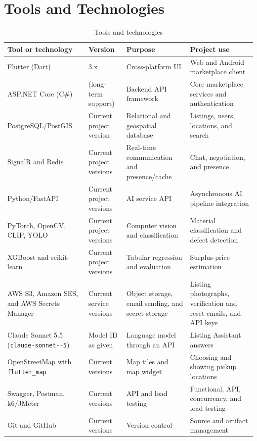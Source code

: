 \section{Tools and Technologies}
\label{sec:tools}
\begin{table}[H]
\centering
\caption{Tools and technologies}
\label{tab:tools-technologies}
\small
\begin{tabularx}{\textwidth}{@{}>{\raggedright\arraybackslash}p{}>{\raggedright\arraybackslash}p{}>{\raggedright\arraybackslash}X >{\raggedright\arraybackslash}X@{}}
\toprule
\textbf{Tool or technology} & \textbf{Version} & \textbf{Purpose} & \textbf{Project use} \\
\midrule
Flutter (Dart) & 3.x & Cross-platform UI & Web and Android marketplace client \\
ASP.NET Core (C\#) & 10 (long-term support) & Backend API framework & Core marketplace services and authentication \\
PostgreSQL/\allowbreak PostGIS & Current project version & Relational and geospatial database & Listings, users, locations, and search \\
SignalR and Redis & Current project versions & Real-time communication and presence/cache & Chat, negotiation, and presence \\
Python/FastAPI & Current project versions & AI service API & Asynchronous AI pipeline integration \\
PyTorch, OpenCV, CLIP, YOLO & Current project versions & Computer vision and classification & Material classification and defect detection \\
XGBoost and scikit-learn & Current project versions & Tabular regression and evaluation & Surplus-price estimation \\
AWS S3, Amazon SES, and AWS Secrets Manager & Current service versions & Object storage, email sending, and secret storage & Listing photographs, verification and reset emails, and API keys \\
Claude Sonnet 5.5 (\texttt{claude-\allowbreak sonnet-\allowbreak 5-5}) & Model ID as given & Language model through an API & Listing Assistant answers \\
OpenStreetMap with \texttt{flutter\_map} & Current versions & Map tiles and map widget & Choosing and showing pickup locations \\
Swagger, Postman, k6/JMeter & Current versions & API and load testing & Functional, API, concurrency, and load testing \\
Git and GitHub & Current versions & Version control & Source and artifact management \\
\bottomrule
\end{tabularx}
\end{table}
